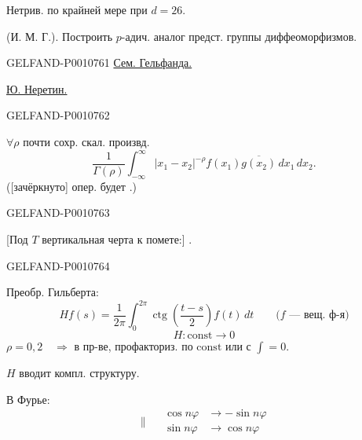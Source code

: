 Нетрив. по крайней мере при \uline{$d=26$}.

 (И. М. Г.). Построить $p$-адич. аналог предст. группы диффеоморфизмов.


\begin{GelfandAdjacentEvidence}{GELFAND-P001076}{1}
\qquad\uline{Сем. Гельфанда.}

\uline{Ю. Неретин.}
\end{GelfandAdjacentEvidence}
\begin{GelfandAdjacentEvidence}{GELFAND-P001076}{2}


$\forall\rho$ почти сохр. скал. произвд.
\begin{equation*}
\frac{1}{\Gamma(\rho)}\int_{-\infty}^{\infty}
|x_1-x_2|^{-\rho}f(x_1)\overline{g(x_2)}\,dx_1\,dx_2.
\tag{1}
\end{equation*}
([зачёркнуто] опер. будет .)
\end{GelfandAdjacentEvidence}
\begin{GelfandAdjacentEvidence}{GELFAND-P001076}{3}

[Под \(T\) вертикальная черта к помете:] .
\end{GelfandAdjacentEvidence}
\begin{GelfandAdjacentEvidence}{GELFAND-P001076}{4}


Преобр. Гильберта:
\begin{equation*}
Hf(s)=\frac{1}{2\pi}\int_0^{2\pi}
\operatorname{ctg}\left(\frac{t-s}{2}\right)f(t)\,dt
\qquad\text{($f$ — вещ. ф-я)}
\tag{2}
\end{equation*}
\begin{equation*}
H:\mathrm{const}\longrightarrow0
\end{equation*}
$\rho=0,2\quad\Rightarrow$ в пр-ве, профакториз. по $\mathrm{const}$ или с $\int=0$.

$H$ вводит компл. структуру.

В Фурье:
\begin{equation*}
\parallel\quad
\begin{aligned}
\cos n\varphi&\longrightarrow-\sin n\varphi\\
\sin n\varphi&\longrightarrow\cos n\varphi
\end{aligned}
\end{equation*}
\end{GelfandAdjacentEvidence}

